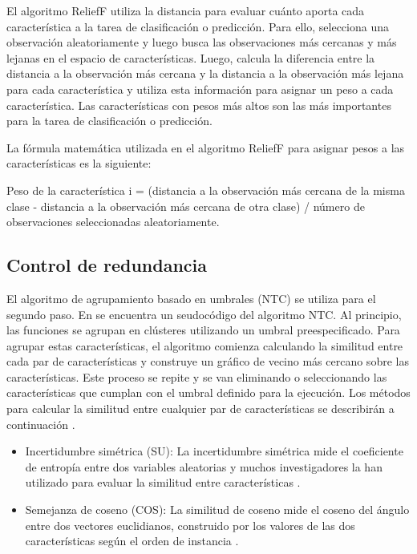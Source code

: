 \begin{itemize}
El algoritmo ReliefF utiliza la distancia para evaluar cuánto aporta cada característica a la tarea de clasificación o predicción. Para ello, selecciona una observación aleatoriamente y luego busca las observaciones más cercanas y más lejanas en el espacio de características. Luego, calcula la diferencia entre la distancia a la observación más cercana y la distancia a la observación más lejana para cada característica y utiliza esta información para asignar un peso a cada característica. Las características con pesos más altos son las más importantes para la tarea de clasificación o predicción.

La fórmula matemática utilizada en el algoritmo ReliefF para asignar pesos a las características es la siguiente:

Peso de la característica i = (distancia a la observación más cercana de la misma clase - distancia a la observación más cercana de otra clase) / número de observaciones seleccionadas aleatoriamente.
\end{itemize}

\subsection{Control de redundancia}
El algoritmo de agrupamiento basado en umbrales (NTC) se utiliza para el segundo paso. En \cite{liu_empirical_2015} se encuentra un seudocódigo del algoritmo NTC.  Al principio, las funciones se agrupan en clústeres utilizando un umbral preespecificado. Para agrupar estas características, el algoritmo comienza calculando la similitud entre cada par de características y construye un gráfico de vecino más cercano sobre las características. Este proceso se repite y se van eliminando o seleccionando las características que cumplan con el umbral definido para la ejecución. Los métodos para calcular la similitud entre cualquier par de características se describirán a continuación \cite{liu_empirical_2015,chen_empirical_2013}.

\begin{itemize}
\item Incertidumbre simétrica (SU): La incertidumbre simétrica mide el coeficiente de entropía entre dos variables aleatorias y muchos investigadores la han utilizado para evaluar la similitud entre características \cite{yu2003feature,liu_empirical_2015}.
\item Semejanza de coseno (COS): La similitud de coseno mide el coseno del ángulo entre dos vectores euclidianos, construido por los valores de las dos características según el orden de instancia \cite{liu_empirical_2015}.
\end{itemize}

